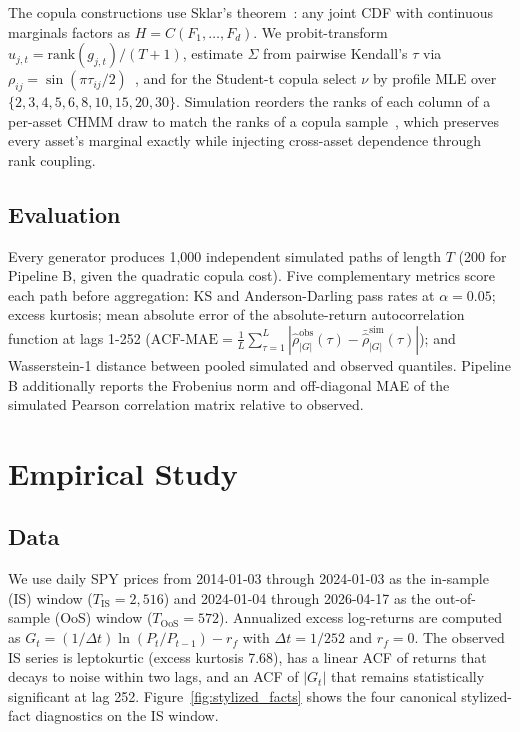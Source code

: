 \documentclass[sigconf,anonymous,nonacm=true]{acmart}
\begin{document}
The copula constructions use Sklar's theorem~\cite{sklar1959fonctions}:
any joint CDF with continuous marginals factors as $H = C(F_1, \ldots,
F_d)$. We probit-transform $u_{j,t} = \text{rank}(g_{j,t}) / (T + 1)$,
estimate $\Sigma$ from pairwise Kendall's $\tau$ via $\rho_{ij} =
\sin(\pi \tau_{ij} / 2)$~\cite{embrechts2002correlation}, and for the
Student-t copula select $\nu$ by profile MLE over $\{2, 3, 4, 5, 6, 8,
10, 15, 20, 30\}$. Simulation reorders the ranks of each column of a
per-asset CHMM draw to match the ranks of a copula
sample~\cite{iman1982distribution}, which preserves every asset's
marginal exactly while injecting cross-asset dependence through rank
coupling.

\subsection{Evaluation}
\label{sec:methods_eval}

Every generator produces 1{,}000 independent simulated paths of length
$T$ (200 for Pipeline B, given the quadratic copula cost). Five
complementary metrics score each path before aggregation: KS and
Anderson-Darling pass rates at $\alpha = 0.05$; excess kurtosis;
mean absolute error of the absolute-return autocorrelation function at
lags 1-252 ($\text{ACF-MAE} = \frac{1}{L} \sum_{\tau = 1}^{L} |
\hat\rho^{\text{obs}}_{|G|}(\tau) - \bar{\hat\rho}^{\text{sim}}_{|G|}(\tau) |$);
and Wasserstein-1 distance between pooled simulated and observed
quantiles. Pipeline B additionally reports the Frobenius norm and
off-diagonal MAE of the simulated Pearson correlation matrix relative
to observed.

\section{Empirical Study}
\label{sec:empirical}

\subsection{Data}

We use daily SPY prices from 2014-01-03 through 2024-01-03 as the
in-sample (IS) window ($T_{\text{IS}} = 2{,}516$) and 2024-01-04 through
2026-04-17 as the out-of-sample (OoS) window ($T_{\text{OoS}} = 572$).
Annualized excess log-returns are computed as $G_t = (1/\Delta t)
\ln(P_t / P_{t-1}) - r_f$ with $\Delta t = 1/252$ and $r_f = 0$. The
observed IS series is leptokurtic (excess kurtosis 7.68), has a linear
ACF of returns that decays to noise within two lags, and an ACF of
$|G_t|$ that remains statistically significant at lag 252.
Figure~\ref{fig:stylized_facts} shows the four canonical stylized-fact
diagnostics on the IS window.
\end{document}

